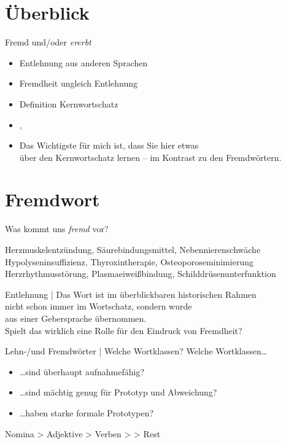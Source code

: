 \section{Überblick}

\begin{frame}
  {Fremd und\slash oder \textit{ererbt}}
  \onslide<+->
  \begin{itemize}[<+->]
    \item Entlehnung aus anderen Sprachen
    \item Fremdheit ungleich Entlehnung
    \item Definition Kernwortschatz
      \Zeile
    \item \citet{Eisenberg2018}, \citet{Schaefer2018b}\\
      \Zeile
    \item Das Wichtigste für mich ist, dass Sie hier etwas\\
      über den \alert{Kernwortschatz} lernen -- im Kontrast zu den Fremdwörtern.
  \end{itemize}
\end{frame}

\section{Fremdwort}

\begin{frame}
  {Was kommt uns \textit{fremd} vor?}
  \onslide<+->
  \onslide<+->
  \begin{exe}
    \ex Herzmuskelentzündung, Säurebindungsmittel, Nebennierenschwäche
    \onslide<+->
    \Halbzeile
    \ex Hypolyseninsuffizienz, Thyroxintherapie, Osteoporoseminimierung
    \onslide<+->
    \Halbzeile
    \ex Herzrhythmusstörung, Plasmaeiweißbindung, Schilddrüsenunterfunktion
  \end{exe}
  \onslide<+->
  \Zeile
  \alert{Entlehnung} | Das Wort ist im überblickbaren historischen Rahmen\\
  nicht schon immer im Wortschatz, sondern wurde\\
  aus einer Gebersprache übernommen.\\
  \onslide<+->
  \Zeile
  Spielt das wirklich eine Rolle für den Eindruck von \alert{Fremdheit}?
\end{frame}

\begin{frame}
  {Lehn-\slash und Fremdwörter | Welche Wortklassen?}
  \onslide<+->
  \onslide<+->
  Welche Wortklassen…\\
  \Halbzeile
  \begin{itemize}[<+->]
    \item \ldots sind überhaupt \alert{aufnahmefähig}?
    \item \ldots sind mächtig genug für Prototyp und Abweichung?
    \item \ldots haben starke formale Prototypen?
  \end{itemize}
  \onslide<+->
  \Zeile
  \alert{Nomina} > \alert{Adjektive} > \alert{Verben} >  > Rest
\end{frame}

